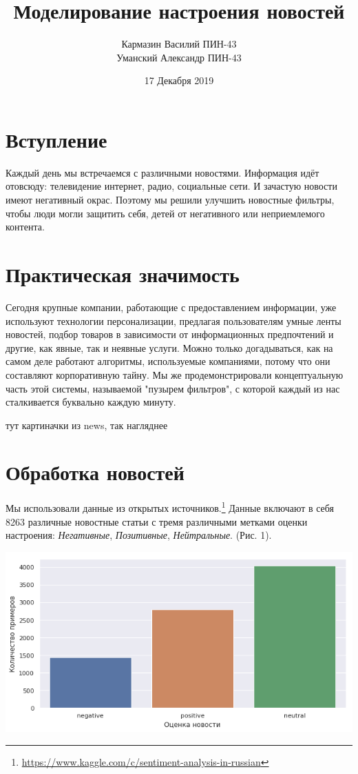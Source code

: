 \documentclass[12pt]{article}
\title{\textbf{Моделирование настроения новостей}}
\date{17 Декабря 2019}
\author{Кармазин Василий ПИН-43\\ Уманский Александр ПИН-43}
\begin{document}
    \maketitle

    \section{Вступление}
        Каждый день мы встречаемся с различными новостями. Информация идёт отовсюду: телевидение
        интернет, радио, социальные сети. И зачастую новости имеют негативный окрас.
        Поэтому мы решили улучшить новостные фильтры, чтобы люди могли защитить себя,
        детей от негативного или неприемлемого контента.

    \section{Практическая значимость}
        Сегодня крупные компании, работающие с предоставлением информации, уже используют технологии персонализации, предлагая пользователям 
        умные ленты новостей, подбор товаров в зависимости от информационных предпочтений и другие, как явные, так и неявные услуги.
        Можно только догадываться, как на самом деле работают алгоритмы, используемые компаниями, потому что они составляют корпоративную тайну. 
        Мы же продемонстрировали концептуальную часть этой системы, называемой "пузырем фильтров", с которой каждый из нас сталкивается буквально каждую минуту. 

        тут картиначки из news, так нагляднее
        
    \section{Обработка новостей}
        Мы использовали данные из открытых источников.\footnote{\href{https://www.kaggle.com/c/sentiment-analysis-in-russian}{https://www.kaggle.com/c/sentiment-analysis-in-russian}}
        Данные включают в себя 8263 различные новостные статьи с тремя различными метками оценки настроения: 
        \textit{Негативные}, \textit{Позитивные}, \textit{Нейтральные}. (Рис. 1).

        \begin{center}
            \includegraphics[scale=0.5]{sent_dist}
        \end{center}
\end{document}
